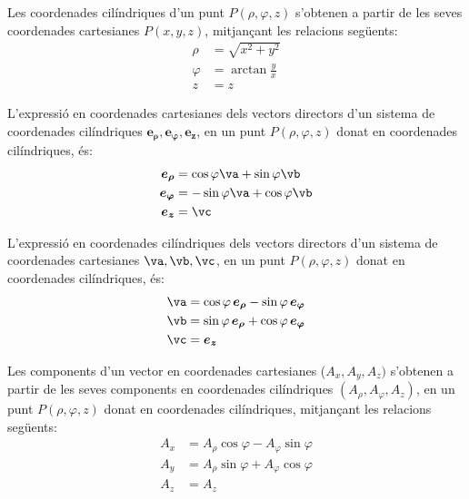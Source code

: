 \documentclass[catalan,a4paper,twoside,11pt]{article}
\begin{document}
Les coordenades  cilíndriques  d'un punt $P(\rho,\varphi,z)$
s'obtenen a partir de les seves coordenades cartesianes $P(x,y,z)$,
mitjançant les relacions següents:
\begin{subequations}\begin{align}
    \rho &= \sqrt{x^2+y^2}\\
    \varphi &=  \arctan\frac{y}{x}\\
    z &= z
\end{align}\end{subequations}

L'expressió en coordenades cartesianes dels vectors directors d'un sistema de coordenades  cilíndriques $\boldsymbol{e_\rho},\boldsymbol{e_\varphi},\boldsymbol{e_z}$, en un punt $P(\rho,\varphi,z)$ donat en coordenades cilíndriques, és:
\begin{subequations}\begin{align}
    \boldsymbol{e_\rho} &=\cos\varphi\va+\sin\varphi\vb \\
    \boldsymbol{e_\varphi} &=-\sin\varphi\va+\cos\varphi\vb \\
    \boldsymbol{e_z} &=\vc
\end{align}\end{subequations}

L'expressió en coordenades cilíndriques dels vectors directors d'un sistema de coordenades  cartesianes $\va,\vb,\vc$, en un punt $P(\rho,\varphi,z)$ donat en coordenades cilíndriques, és:
\begin{subequations}\begin{align}
    \va &=\cos\varphi\,\boldsymbol{e_\rho}-\sin\varphi\,\boldsymbol{e_\varphi} \\
    \vb &=\sin\varphi\,\boldsymbol{e_\rho}+\cos\varphi\,\boldsymbol{e_\varphi} \\
    \vc &=\boldsymbol{e_z}
\end{align}\end{subequations}

Les components d'un vector en coordenades cartesianes ($A_x, A_y, A_z)$ s'obtenen a partir de les seves components en coordenades cilíndriques $(A_\rho, A_\varphi, A_z)$, en un punt $P(\rho,\varphi,z)$ donat en coordenades cilíndriques, mitjançant les relacions següents:
\begin{subequations}\begin{align}
    A_x &=A_\rho \cos\varphi -A_\varphi\sin\varphi \\
    A_y &=A_\rho\sin\varphi +A_\varphi\cos\varphi\\
    A_z &= A_z
\end{align}\end{subequations}
\end{document}
